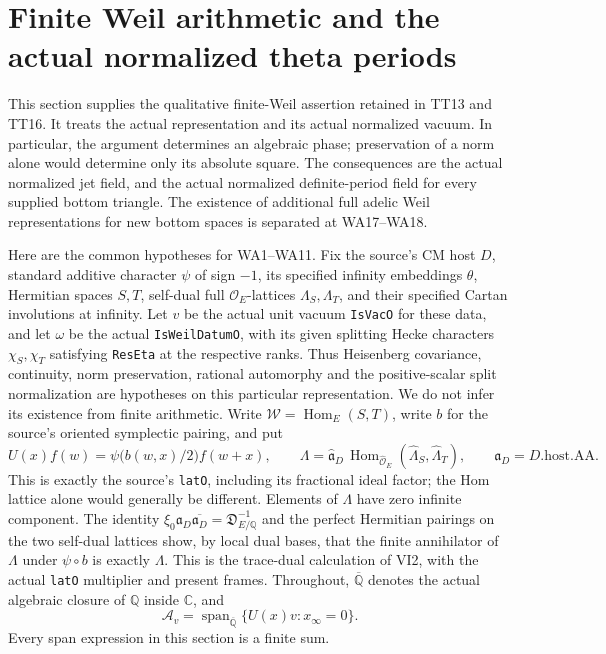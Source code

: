 \section{Finite Weil arithmetic and the actual normalized theta periods}
\label{sec:finite-weil-arithmetic}

This section supplies the qualitative finite-Weil assertion retained in
TT13 and TT16.  It treats the actual representation and its actual
normalized vacuum.  In particular, the argument determines an algebraic
phase; preservation of a norm alone would determine only its absolute
square.  The consequences are the actual normalized jet field, and the
actual normalized definite-period field for every supplied bottom
triangle.  The existence of additional full adelic Weil representations
for new bottom spaces is separated at WA17--WA18.

Here are the common hypotheses for WA1--WA11.  Fix the source's CM host
$D$, standard additive character $\psi$ of sign $-1$, its specified
infinity embeddings $\theta$, Hermitian spaces $S,T$, self-dual full
$\mathcal O_E$-lattices $\Lambda_S,\Lambda_T$, and their specified Cartan
involutions at infinity.  Let $v$ be the actual unit vacuum
\texttt{IsVacO} for these data, and let $\omega$ be the actual
\texttt{IsWeilDatumO}, with its given splitting Hecke characters
$\chi_S,\chi_T$ satisfying \texttt{ResEta} at the respective ranks.
Thus Heisenberg covariance, continuity, norm preservation, rational
automorphy and the positive-scalar split normalization are hypotheses
on this particular representation.  We do not infer its existence
from finite arithmetic.  Write $\mathcal W=\operatorname{Hom}_E(S,T)$,
write $b$ for the source's oriented symplectic pairing, and put
\[
 U(x)f(w)=\psi\bigl(b(w,x)/2\bigr)f(w+x),\qquad
 \Lambda=\widehat{\mathfrak a}_D\,
          \operatorname{Hom}_{\widehat{\mathcal O}_E}
                 (\widehat\Lambda_S,\widehat\Lambda_T),
             \qquad\mathfrak a_D=D.\mathrm{host}.\mathrm{AA}.
                                                               \tag{WA.1}
\]
This is exactly the source's \texttt{latO}, including its fractional
ideal factor; the Hom lattice alone would generally be different.
Elements of $\Lambda$ have zero infinite component.  The identity
$\xi_0\mathfrak a_D\overline{\mathfrak a_D}
=\mathfrak D_{E/\mathbb Q}^{-1}$ and the perfect Hermitian
pairings on the two self-dual lattices show, by local dual bases,
that the finite annihilator of $\Lambda$ under $\psi\circ b$ is
exactly $\Lambda$.  This is the trace-dual calculation of VI2,
with the actual \texttt{latO} multiplier and present frames.
Throughout, $\overline{\mathbb Q}$ denotes the actual algebraic closure
of $\mathbb Q$ inside $\mathbb C$, and
\[
 \mathcal A_v=\operatorname{span}_{\overline{\mathbb Q}}
                     \{U(x)v:x_\infty=0\}.                  \tag{WA.2}
\]
Every span expression in this section is a finite sum.

